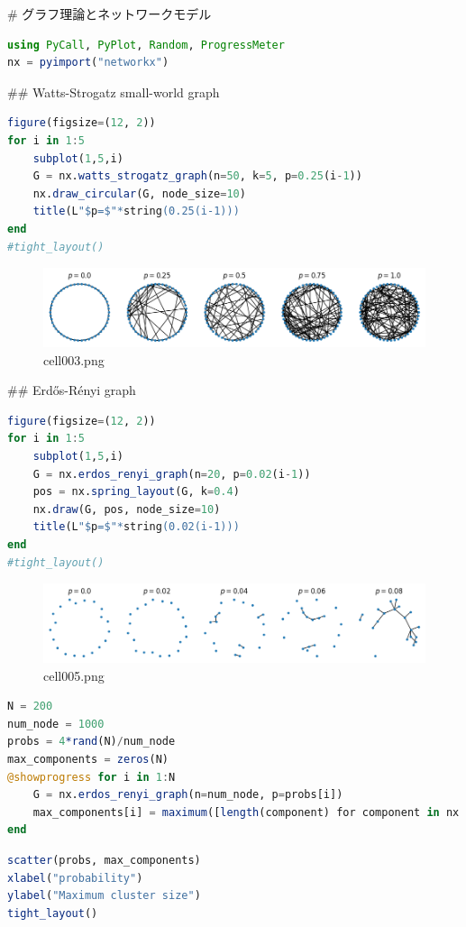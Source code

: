 # グラフ理論とネットワークモデル
\begin{lstlisting}[language=julia]
using PyCall, PyPlot, Random, ProgressMeter
nx = pyimport("networkx")
\end{lstlisting}
## Watts-Strogatz small-world graph
\begin{lstlisting}[language=julia]
figure(figsize=(12, 2))
for i in 1:5
    subplot(1,5,i)
    G = nx.watts_strogatz_graph(n=50, k=5, p=0.25(i-1))
    nx.draw_circular(G, node_size=10)
    title(L"$p=$"*string(0.25(i-1)))
end
#tight_layout()
\end{lstlisting}
\begin{figure}[ht]
	\centering
	\includegraphics[scale=0.8, max width=\linewidth]{./fig/appendix/graph-theory-network-model/cell003.png}
	\caption{cell003.png}
	\label{cell003.png}
\end{figure}
##  Erdős-Rényi graph
\begin{lstlisting}[language=julia]
figure(figsize=(12, 2))
for i in 1:5
    subplot(1,5,i)
    G = nx.erdos_renyi_graph(n=20, p=0.02(i-1))
    pos = nx.spring_layout(G, k=0.4)
    nx.draw(G, pos, node_size=10)
    title(L"$p=$"*string(0.02(i-1)))
end
#tight_layout()
\end{lstlisting}
\begin{figure}[ht]
	\centering
	\includegraphics[scale=0.8, max width=\linewidth]{./fig/appendix/graph-theory-network-model/cell005.png}
	\caption{cell005.png}
	\label{cell005.png}
\end{figure}
\begin{lstlisting}[language=julia]
N = 200
num_node = 1000
probs = 4*rand(N)/num_node
max_components = zeros(N)
@showprogress for i in 1:N
    G = nx.erdos_renyi_graph(n=num_node, p=probs[i])
    max_components[i] = maximum([length(component) for component in nx.connected_components(G)])
end
\end{lstlisting}
\begin{lstlisting}[language=julia]
scatter(probs, max_components)
xlabel("probability")
ylabel("Maximum cluster size")
tight_layout()
\end{lstlisting}
